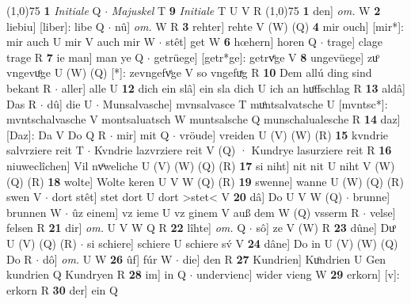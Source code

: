 \documentclass[8pt,a4paper,notitlepage]{article}
\begin{document}
\begin{table}[ht]
\begin{minipage}[t]{0.5\linewidth}
\line(1,0){75} \newline
\textbf{1} \textit{Initiale} Q   $\cdot$ \textit{Majuskel} T  \textbf{9} \textit{Initiale} T U V R  \newline
\line(1,0){75} \newline
\textbf{1} den] \textit{om.} W \textbf{2} liebiu] [liber]: libe Q  $\cdot$ nû] \textit{om.} W R \textbf{3} rehter] rehte V (W) (Q) \textbf{4} mir ouch] [mir*]: mir auch U mir V auch mir W  $\cdot$ stêt] get W \textbf{6} hœhern] horen Q  $\cdot$ trage] clage trage R \textbf{7} ie man] man ye Q  $\cdot$ getrüege] [getr*ge]: getrvͤge V \textbf{8} ungevüege] zuͦ vngevuͦge U (W) (Q) [*]: zevngefvͤge  V so vngefuͯg R \textbf{10} Dem allú ding sind bekant R  $\cdot$ aller] alle U \textbf{12} dich ein slâ] ein sla dich U ich an huͦffschlag R \textbf{13} aldâ] Das R  $\cdot$ dû] die U  $\cdot$ Munsalvasche] mvnsalvasce T muͦntsalvatsche U [mvntsc*]: mvntschalvasche V montsaluatsch W muntsalsche Q munschalualesche R \textbf{14} daz] [Daz]: Da V Do Q R  $\cdot$ mir] mit Q  $\cdot$ vröude] vreiden U (V) (W) (R) \textbf{15} kvndrie salvrziere reit T  $\cdot$ Kvndrie lazvrziere reit V (Q) · Kundrye lasurziere reit R \textbf{16} niuweclîchen] Vil nvͦweliche U (V) (W) (Q) (R) \textbf{17} si niht] nit nit U niht V (W) (Q) (R) \textbf{18} wolte] Wolte keren U V W (Q) (R) \textbf{19} swenne] wanne U (W) (Q) (R) swen V  $\cdot$ dort stêt] stet dort U dort >stet< V \textbf{20} dâ] Do U V W (Q)  $\cdot$ brunne] brunnen W  $\cdot$ ûz einem] vz ieme U vz ginem V auß dem W (Q) vsserm R  $\cdot$ velse] felsen R \textbf{21} dir] \textit{om.} U V W Q R \textbf{22} lîhte] \textit{om.} Q  $\cdot$ sô] ze V (W) R \textbf{23} dûne] Duͦ U (V) (Q) (R)  $\cdot$ si schiere] schiere U schiere sv́ V \textbf{24} dâne] Do in U (V) (W) (Q) Do R  $\cdot$ dô] \textit{om.} U W \textbf{26} ûf] fúr W  $\cdot$ die] den R \textbf{27} Kundrien] Kuͦndrien U Gen kundrien Q Kundryen R \textbf{28} im] in Q  $\cdot$ undervienc] wider vieng W \textbf{29} erkorn] [v]: erkorn R \textbf{30} der] ein Q \newline
\end{minipage}
\end{table}
\end{document}
